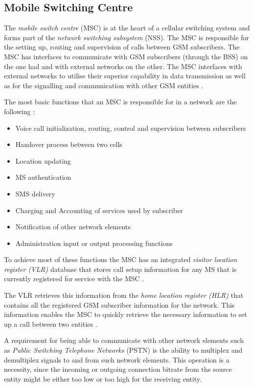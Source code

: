 \subsection{Mobile Switching Centre}

The \emph{mobile switch centre} (MSC) is at the heart of a cellular switching system and forms part of the \emph{network switching subsystem} (NSS). The MSC is responsible for the setting up, routing and supervision of calls between GSM subscribers\cite{GSM92,GSMSysEngin}. The MSC has interfaces to communicate with GSM subscribers (through the BSS) on the one had and with external networks on the other\cite{GSM92}. The MSC interfaces with external networks to utilise their superior capability in data transmission as well as for the signalling and communication with other GSM entities \cite{GSM92}. 

The most basic functions that an MSC is responsible for in a network are the following \cite{wirelesstelcoMullet}:
\begin{itemize}
\item Voice call initialization, routing, control and supervision between subscribers
\item Handover process between two cells
\item Location updating
\item MS authentication
\item SMS delivery
\item Charging and Accounting of services used by subscriber
\item Notification of other network elements
\item Administration input or output processing functions
\end{itemize}

To achieve most of these functions the MSC has an integrated \emph{visitor location register (VLR)} database that stores call setup information for any MS that is currently registered for service with the MSC \cite{GSM92,wirelesstelcoMullet}. 

The VLR retrieves this information from the \emph{home location register (HLR)} that contains all the registered GSM subscriber information for the network. This information enables the MSC to quickly retrieve the necessary information to set up a call between two entities \cite{GSMSysEngin,GSMSecurInTeleNetwork}.

A requirement for being able to communicate with other network elements such as \emph{Public Switching Telephone Networks} (PSTN) is the ability to multiplex and demultiplex signals to and from such network elements. This operation is a necessity, since the incoming or outgoing connection bitrate from the source entity might be either too low or too high for the receiving entity.

